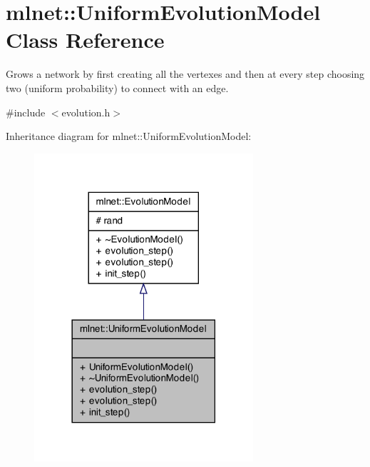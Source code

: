\hypertarget{classmlnet_1_1_uniform_evolution_model}{\section{mlnet\+:\+:Uniform\+Evolution\+Model Class Reference}
\label{classmlnet_1_1_uniform_evolution_model}
}


Grows a network by first creating all the vertexes and then at every step choosing two (uniform probability) to connect with an edge.  




{\ttfamily \#include $<$evolution.\+h$>$}



Inheritance diagram for mlnet\+:\+:Uniform\+Evolution\+Model\+:\nopagebreak
\begin{figure}[H]
\begin{center}
\leavevmode
\includegraphics[width=230pt]{classmlnet_1_1_uniform_evolution_model__inherit__graph}
\end{center}
\end{figure}


